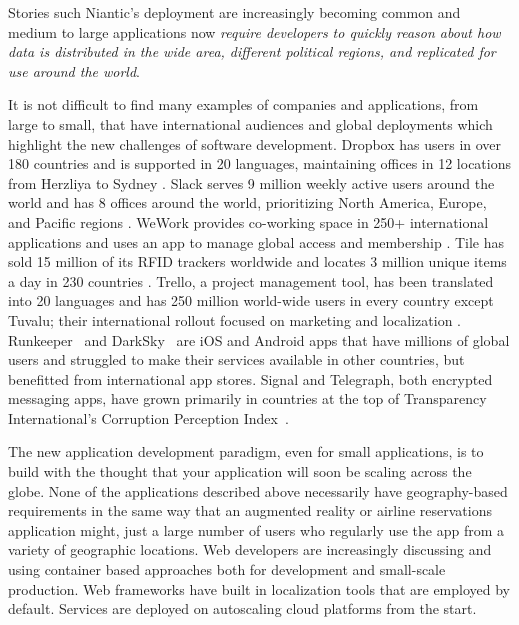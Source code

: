 Stories such Niantic's deployment are increasingly becoming common and medium to large applications now \emph{require developers to quickly reason about how data is distributed in the wide area, different political regions, and replicated for use around the world}.

It is not difficult to find many examples of companies and applications, from large to small, that have international audiences and global deployments which highlight the new challenges of software development.
Dropbox has users in over 180 countries and is supported in 20 languages, maintaining offices in 12 locations from Herzliya to Sydney \cite{dropbox}.
Slack serves 9 million weekly active users around the world and has 8 offices around the world, prioritizing North America, Europe, and Pacific regions \cite{slack}.
WeWork provides co-working space in 250+ international applications and uses an app to manage global access and membership \cite{wework_global_access}.
Tile has sold 15 million of its RFID trackers worldwide and locates 3 million unique items a day in 230 countries \cite{tile}.
Trello, a project management tool, has been translated into 20 languages and has 250 million world-wide users in every country except Tuvalu; their international rollout focused on marketing and localization \cite{trello}.
Runkeeper~\cite{runkeeper} and DarkSky~\cite{darksky} are iOS and Android apps that have millions of global users and struggled to make their services available in other countries, but benefitted from international app stores.
Signal and Telegraph, both encrypted messaging apps, have grown primarily in countries at the top of Transparency International's Corruption Perception Index~\cite{signal}.

The new application development paradigm, even for small applications, is to build with the thought that your application will soon be scaling across the globe.
None of the applications described above necessarily have geography-based requirements in the same way that an augmented reality or airline reservations application might, just a large number of users who regularly use the app from a variety of geographic locations.
Web developers are increasingly discussing and using container based approaches both for development and small-scale production.
Web frameworks have built in localization tools that are employed by default.
Services are deployed on autoscaling cloud platforms from the start.

